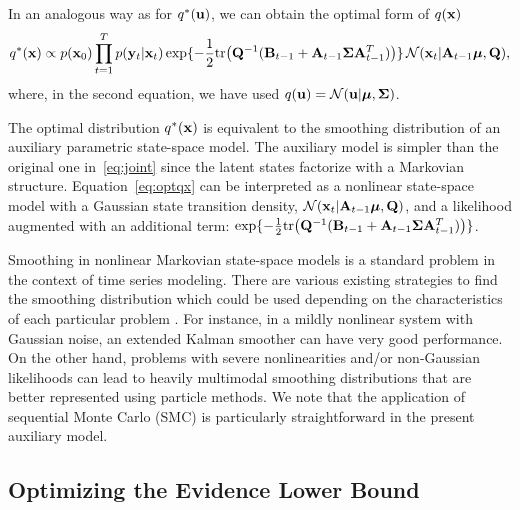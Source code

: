 \documentclass{article} %
\newcommand{\n}[1]{\mathbf{#1}}
\newcommand{\x}{\mathbf{x}}
\newcommand{\y}{\mathbf{y}}
\newcommand{\bSigma}{\boldsymbol\Sigma}
\begin{document}
In an analogous way as for $q^*({\bf u})$, we can obtain the optimal form of $q({\bf x})$ 
\begin{equation}
\label{eq:optqx}
q^*(\bx)\propto p(\x_0) \prod_{t=1}^T p(\y_t | \x_t) \exp\{-\frac{1}{2}{\rm tr}\big( \n{Q}^{-1} ({\n{B}_{t-1}} + {\n{A}_{t-1}} \bSigma {\n{A}}^T_{t-1}) \big) \} \, \mathcal{N}(\x_t |\n{A}_{t-1} \bmu, \n{Q}),
\end{equation}
where, in the second equation, we have used $q(\bu) = \cN(\bu | \bmu, \bSigma)$.

The optimal distribution $q^*({\bf x})$ is equivalent to the smoothing distribution of an auxiliary parametric state-space model. The auxiliary model is simpler than the original one in~\eqref{eq:joint} since the latent states factorize with a Markovian structure. Equation~\eqref{eq:optqx} can be interpreted as a nonlinear state-space model with a Gaussian state transition density, $\mathcal{N}(\x_t |\n{A}_{t-1} \bmu, \n{Q})$, and a likelihood augmented with an additional term: $\exp\{-\frac{1}{2} {\rm tr}\big( \n{Q}^{-1} ({\n{B}}_{t-1} + {\n{A}_{t-1}} \bSigma {\n{A}}^T_{t-1}) \big)\}$.

Smoothing in nonlinear Markovian state-space models is a standard problem in the context of time series modeling. There are various existing strategies to find the smoothing distribution which could be used depending on the characteristics of each particular problem \citep{Sarkka2013}. For instance, in a mildly nonlinear system with Gaussian noise, an extended Kalman smoother can have very good performance. On the other hand, problems with severe nonlinearities and/or non-Gaussian likelihoods can lead to heavily multimodal smoothing distributions that are better represented using particle methods. We note that the application of sequential Monte Carlo (SMC) is particularly straightforward in the present auxiliary model. 




\subsection{Optimizing the Evidence Lower Bound}
\end{document}
